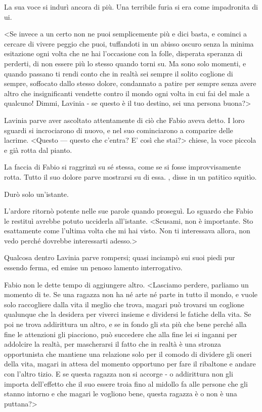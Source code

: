 La sua voce si indurì ancora di più. Una terribile furia si era come
impadronita di ui.

\textless{}Se invece a un certo non ne puoi semplicemente più e dici
basta, e cominci a cercare di vivere peggio che puoi, tuffandoti in un
abisso oscuro senza la minima esitazione ogni volta che ne hai
l'occasione con la folle, disperata speranza di perderti, di non essere
più lo stesso quando torni su. Ma sono solo momenti, e quando passano ti
rendi conto che in realtà sei sempre il solito coglione di sempre,
soffocato dallo stesso dolore, condannato a patire per sempre senza
avere altro che insignificanti vendette contro il mondo ogni volta in
cui fai del male a qualcuno! Dimmi, Lavinia - se questo è il tuo
destino, sei una persona buona?\textgreater{}

Lavinia parve aver ascoltato attentamente di ciò che Fabio aveva detto.
I loro sguardi si incrociarono di nuovo, e nel suo cominciarono a
comparire delle lacrime. \textless{}Questo --- questo che c'entra? E'
così che stai?\textgreater{} chiese, la voce piccola e già rotta dal
pianto.

La faccia di Fabio si raggrinzì su sé stessa, come se si fosse
improvvisamente rotta. Tutto il suo dolore parve mostrarsi su di essa. ,
disse in un patitico squitìo.

Durò solo un'istante.

L'ardore ritornò potente nelle sue parole quando proseguì. Lo sguardo
che Fabio le restituì avrebbe potuto ucciderla all'istante.
\textless{}Scusami, non è importante. Sto esattamente come l'ultima
volta che mi hai visto. Non ti interessava allora, non vedo perché
dovrebbe interessarti adesso.\textgreater{}

Qualcosa dentro Lavinia parve rompersi; quasi inciampò sui suoi piedi
pur essendo ferma, ed emise un penoso lamento interrogativo.

Fabio non le dette tempo di aggiungere altro. \textless{}Lasciamo
perdere, parliamo un momento di te. Se una ragazza non ha né arte né
parte in tutto il mondo, e vuole solo raccogliere dalla vita il meglio
che trova, magari può trovarsi un coglione qualunque che la desidera per
viverci insieme e dividersi le fatiche della vita. Se poi ne trova
addirittura un altro, e se in fondo gli sta più che bene perché alla
fine le attenzioni gli piacciono, può succedere che alla fine lei si
inganni per addolcire la realtà, per mascherarsi il fatto che in realtà
è una stronza opportunista che mantiene una relazione solo per il comodo
di dividere gli oneri della vita, magari in attesa del momento opportuno
per fare il ribaltone e andare con l'altro tizio. E se questa ragazza
non si accorge - o addirittura non gli importa dell'effetto che il suo
essere troia fino al midollo fa alle persone che gli stanno intorno e
che magari le vogliono bene, questa ragazza è o non è una
puttana?\textgreater{}

